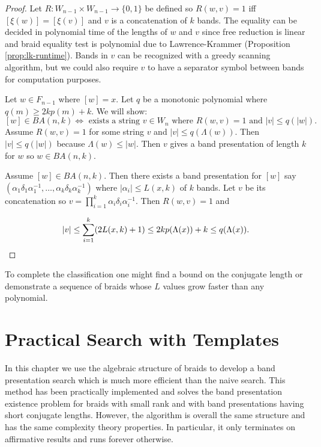 \documentclass[12pt]{thesis}
\begin{document}
\begin{proof}
    Let $R \colon W_{n-1} \times W_{n-1} \rightarrow \{ 0, 1\}$ be defined
    so  $R(w, v) = 1$ iff $[\xi(w)] = [\xi(v)]$ and $v$ is a concatenation of $k$ bands.
    The equality can be decided in polynomial time of the lengths of $w$ and $v$
    since free reduction is linear and
    braid equality test is polynomial due to Lawrence-Krammer (Proposition \ref{prop:lk-runtime}).
    Bands in $v$ can be recognized
    with a greedy scanning algorithm, but we could also require $v$ to 
    have a separator symbol between bands for computation purposes.

    Let $w \in F_{n-1}$ where $[w] = x$.
    Let $q$ be a monotonic polynomial where $q(m) \geq 2kp(m) + k$.
    We will show:
    \[
        [w] \in BA(n, k) \Leftrightarrow \text{ exists a string $v \in W_{n}$ where $R(w, v) = 1$ and $|v| \leq q(|w|)$}.
    \]
    Assume $R(w, v) = 1$ for some string $v$ and $|v| \leq q(\Lambda(w))$.
    Then $|v| \leq q(|w|)$ because $\Lambda(w) \leq |w|$.
    Then $v$ gives a band presentation of length $k$ for $w$ so $w \in BA(n, k)$. 

    \begin{sloppypar}
    Assume $[w] \in BA(n, k)$.
    Then there exists a band presentation for $[w]$
    say
     $(\alpha_{1} \delta_{1} \alpha_{1}^{-1},
    \ldots, \alpha_{k} \delta_{k} \alpha_{k}^{-1})$
    where $|\alpha_{i}| \leq L(x, k)$ of $k$ bands.
    Let $v$ be its concatenation so $v = \prod_{i=1}^{k} \alpha_{i}\delta_{i}\alpha_{i}^{-1}$.
    Then $R(w, v) = 1$ and
    \end{sloppypar}
    \[
        |v| \leq \sum_{i=1}^{k} (2L(x, k) + 1) \leq  2kp(\Lambda(x)) + k \leq q(\Lambda(x)). \qedhere 
    \] 
\end{proof}

To complete the classification one might find a bound on the conjugate length
or demonstrate a sequence of braids
whose $L$ values grow faster than any polynomial.

\chapter{Practical Search with Templates}

In this chapter we use the algebraic structure of braids to develop a band presentation search which is much more
efficient than the naive search.
This method has been practically implemented and
solves the band presentation existence problem for braids with small rank and with band presentations having short
conjugate lengths.
However, the algorithm is overall the same structure and has the same complexity theory properties.
In particular, it only terminates on affirmative results
and runs forever otherwise. 
\end{document}
